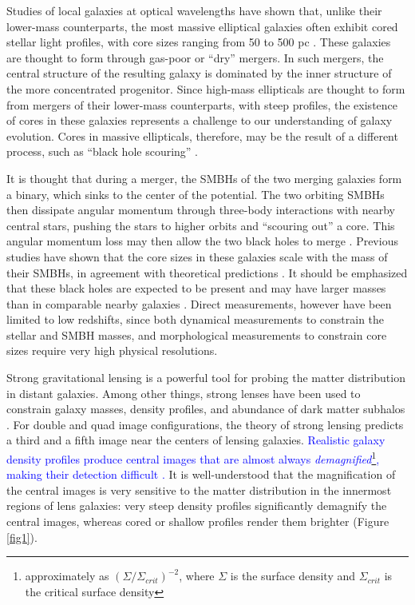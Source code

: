 \documentclass[chicago]{emulateapj}
\newcommand{\blue}{\textcolor{blue}}
\newcommand{\red}{\textcolor{red}}
\begin{document}
Studies of local galaxies at optical wavelengths have shown that, unlike their lower-mass counterparts, the most massive elliptical galaxies often exhibit cored stellar light profiles, with core sizes ranging from 50 to 500 pc \citep[e.g.,][]{Ferrarese:06}. 
These galaxies are thought to form through gas-poor or ``dry'' mergers. In such mergers, the central structure of the resulting galaxy is dominated by the inner structure of the more concentrated progenitor.  Since high-mass ellipticals are thought to form from mergers of their lower-mass counterparts, with steep profiles, the existence of cores in these galaxies represents a challenge to our understanding of galaxy evolution. Cores in massive ellipticals, therefore, may be the result of a different process, such as  
``black hole scouring'' \citep{Thomas:14}.

It is thought that during a merger, the SMBHs of the two merging galaxies form a binary, which sinks to the center of the potential. The two orbiting SMBHs then dissipate angular momentum through three-body interactions with nearby central stars, pushing the stars to higher orbits and ``scouring out'' a core. This angular momentum loss may then allow the two black holes to merge \citep{Begelman:80}.
Previous studies have shown that the core sizes in these galaxies scale with the mass of their SMBHs, in agreement with theoretical predictions \citep{Kormendy:09,Kormendy:13}. It should be emphasized that these black holes are expected to be present and may have larger masses than in comparable nearby galaxies \citep{Bennert:10}. Direct measurements, however have been limited to low redshifts, since both dynamical measurements to constrain the stellar and SMBH masses, and morphological measurements to constrain core sizes require very high physical resolutions. 


Strong gravitational lensing is a powerful tool for probing the matter distribution in distant galaxies. Among other things, strong lenses have been used to constrain galaxy masses, density profiles, and abundance of dark matter subhalos \citep[e.g.,][]{dalal:02, Gavazzi:07, Bolton:08}. For double and quad image configurations, the theory of strong lensing predicts a third and a fifth image near the centers of lensing galaxies. 
\blue{Realistic galaxy density profiles produce central images that are almost always \emph{demagnified}\footnote{approximately as $(\Sigma/\Sigma_{crit})^{-2}$, where $\Sigma$ is the surface density and $\Sigma_{crit}$ is the critical surface density}, making their detection difficult \citep[e.g.,][]{Jackson:13}.}  
 It is well-understood that the magnification of the central images is very sensitive to the matter distribution in the innermost regions of lens galaxies: very steep density profiles significantly demagnify the central images, whereas cored or shallow profiles render them brighter (Figure \ref{fig1}). 
\end{document}
